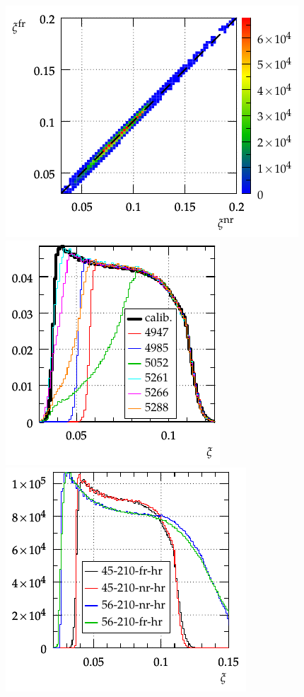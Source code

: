 \documentclass{article}
\begin{document}
\begin{figure}[h!]
\begin{center}
\hskip-15mm
\includegraphics{fig/summary/xi_NF_corr_cmp.pdf}
\includegraphics{fig/summary/xi_cmp_run.pdf}
\includegraphics{fig/summary/xi_cmp_rp.pdf}

\end{center}
\end{figure}
\end{document}
